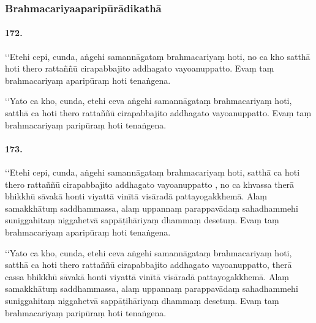 \subsubsection{Brahmacariyaaparipūrādikathā}

\paragraph{172.} ‘‘Etehi cepi, cunda, aṅgehi samannāgataṃ brahmacariyaṃ hoti, no ca kho satthā hoti thero rattaññū cirapabbajito addhagato vayoanuppatto. Evaṃ taṃ brahmacariyaṃ aparipūraṃ hoti tenaṅgena.

‘‘Yato ca kho, cunda, etehi ceva aṅgehi samannāgataṃ brahmacariyaṃ hoti, satthā ca hoti thero rattaññū cirapabbajito addhagato vayoanuppatto. Evaṃ taṃ brahmacariyaṃ paripūraṃ hoti tenaṅgena.

\paragraph{173.} ‘‘Etehi cepi, cunda, aṅgehi samannāgataṃ brahmacariyaṃ hoti, satthā ca hoti thero rattaññū cirapabbajito addhagato vayoanuppatto , no ca khvassa therā bhikkhū sāvakā honti viyattā vinītā visāradā pattayogakkhemā. Alaṃ samakkhātuṃ saddhammassa, alaṃ uppannaṃ parappavādaṃ sahadhammehi suniggahitaṃ niggahetvā sappāṭihāriyaṃ dhammaṃ desetuṃ. Evaṃ taṃ brahmacariyaṃ aparipūraṃ hoti tenaṅgena.

‘‘Yato ca kho, cunda, etehi ceva aṅgehi samannāgataṃ brahmacariyaṃ hoti, satthā ca hoti thero rattaññū cirapabbajito addhagato vayoanuppatto, therā cassa bhikkhū sāvakā honti viyattā vinītā visāradā pattayogakkhemā. Alaṃ samakkhātuṃ saddhammassa, alaṃ uppannaṃ parappavādaṃ sahadhammehi suniggahitaṃ niggahetvā sappāṭihāriyaṃ dhammaṃ desetuṃ. Evaṃ taṃ brahmacariyaṃ paripūraṃ hoti tenaṅgena.

